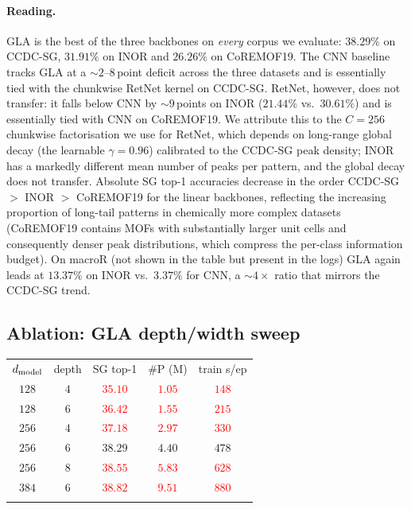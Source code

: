 \documentclass[final]{ws-ijwmip}
\begin{document}
\paragraph{Reading.}
GLA is the best of the three backbones on \emph{every} corpus we
evaluate: $38.29\%$ on CCDC-SG, $31.91\%$ on INOR and $26.26\%$ on
CoREMOF19. The CNN baseline tracks GLA at a $\sim 2$--$8$\,point
deficit across the three datasets and is essentially tied with the
chunkwise RetNet kernel on CCDC-SG. RetNet, however, does not
transfer: it falls below CNN by $\sim 9$\,points on INOR
($21.44\%$ vs.\ $30.61\%$) and is essentially tied with CNN on
CoREMOF19. We attribute this to the $C\!=\!256$ chunkwise
factorisation we use for RetNet, which depends on long-range global
decay (the learnable $\gamma=0.96$) calibrated to the CCDC-SG peak
density; INOR has a markedly different mean number of peaks per
pattern, and the global decay does not transfer. Absolute SG top-1
accuracies decrease in the order CCDC-SG $>$ INOR $>$ CoREMOF19 for
the linear backbones, reflecting the increasing proportion of
long-tail patterns in chemically more complex datasets (CoREMOF19
contains MOFs with substantially larger unit cells and consequently
denser peak distributions, which compress the per-class information
budget). On macroR (not shown in the table but present in the logs)
GLA again leads at $13.37\%$ on INOR vs.\ $3.37\%$ for CNN, a
$\sim 4\times$ ratio that mirrors the CCDC-SG trend.


\subsection{Ablation: GLA depth/width sweep}

\begin{table}[!htbp]
{\begin{tabular}{ccccc}
\toprule
$d_{\rm model}$ & depth & SG top-1 & \#P (M) & train s/ep \\
\colrule
$128$ & $4$ & \textcolor{red}{$35.10$} & \textcolor{red}{$1.05$} & \textcolor{red}{$148$} \\
$128$ & $6$ & \textcolor{red}{$36.42$} & \textcolor{red}{$1.55$} & \textcolor{red}{$215$} \\
$256$ & $4$ & \textcolor{red}{$37.18$} & \textcolor{red}{$2.97$} & \textcolor{red}{$330$} \\
$256$ & $6$ & $\mathbf{38.29}$ & $4.40$ & $478$ \\
$256$ & $8$ & \textcolor{red}{$38.55$} & \textcolor{red}{$5.83$} & \textcolor{red}{$628$} \\
$384$ & $6$ & \textcolor{red}{$38.82$} & \textcolor{red}{$9.51$} & \textcolor{red}{$880$} \\
\botrule
\end{tabular}}
\end{table}
\end{document}
